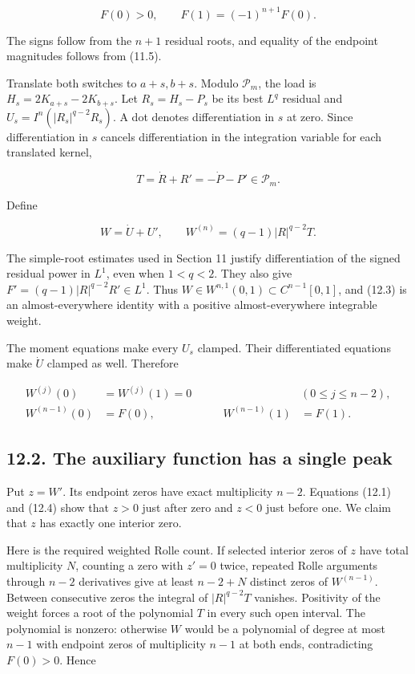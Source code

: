 \documentclass[11pt]{article}
\begin{document}
\[
F(0)>0,\qquad F(1)=(-1)^{n+1}F(0).
\tag{12.1}
\]

The signs follow from the \(n+1\) residual roots, and equality of the
endpoint magnitudes follows from (11.5).

Translate both switches to \(a+s,b+s\). Modulo \(\mathcal P_m\), the
load is \(H_s=2K_{a+s}-2K_{b+s}\). Let \(R_s=H_s-P_s\) be its best
\(L^q\) residual and \(U_s=I^n(|R_s|^{q-2}R_s)\). A dot denotes
differentiation in \(s\) at zero. Since differentiation in \(s\) cancels
differentiation in the integration variable for each translated kernel,

\[
T=\dot R+R'=-\dot P-P'\in\mathcal P_m.
\tag{12.2}
\]

Define

\[
W=\dot U+U',\qquad W^{(n)}=(q-1)|R|^{q-2}T.
\tag{12.3}
\]

The simple-root estimates used in Section 11 justify differentiation of
the signed residual power in \(L^1\), even when \(1<q<2\). They also
give \(F'=(q-1)|R|^{q-2}R'\in L^1\). Thus
\(W\in W^{n,1}(0,1)\subset C^{n-1}[0,1]\), and (12.3) is an
almost-everywhere identity with a positive almost-everywhere integrable
weight.

The moment equations make every \(U_s\) clamped. Their differentiated
equations make \(\dot U\) clamped as well. Therefore

\[
\begin{aligned}
W^{(j)}(0)&=W^{(j)}(1)=0 &&(0\le j\le n-2),\\
W^{(n-1)}(0)&=F(0),&\qquad W^{(n-1)}(1)&=F(1).
\end{aligned}
\tag{12.4}
\]

\subsection{12.2. The auxiliary function has a single
peak}\label{the-auxiliary-function-has-a-single-peak}

Put \(z=W'\). Its endpoint zeros have exact multiplicity \(n-2\).
Equations (12.1) and (12.4) show that \(z>0\) just after zero and
\(z<0\) just before one. We claim that \(z\) has exactly one interior
zero.

Here is the required weighted Rolle count. If selected interior zeros of
\(z\) have total multiplicity \(N\), counting a zero with \(z'=0\)
twice, repeated Rolle arguments through \(n-2\) derivatives give at
least \(n-2+N\) distinct zeros of \(W^{(n-1)}\). Between consecutive
zeros the integral of \(|R|^{q-2}T\) vanishes. Positivity of the weight
forces a root of the polynomial \(T\) in every such open interval. The
polynomial is nonzero: otherwise \(W\) would be a polynomial of degree
at most \(n-1\) with endpoint zeros of multiplicity \(n-1\) at both
ends, contradicting \(F(0)>0\). Hence
\end{document}
